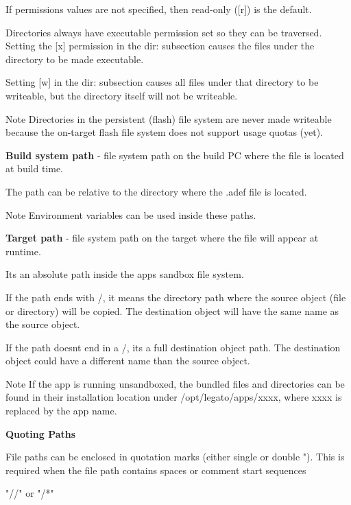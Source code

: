 If permissions values are not specified, then read-\/only (\mbox{[}r\mbox{]}) is the default.

Directories always have executable permission set so they can be traversed. Setting the {\ttfamily \mbox{[}x\mbox{]}} permission in the {\ttfamily dir\+:} subsection causes the files under the directory to be made executable.

Setting {\ttfamily \mbox{[}w\mbox{]}} in the {\ttfamily dir\+:} subsection causes all files under that directory to be writeable, but the directory itself will not be writeable.

\begin{DoxyNote}{Note}
Directories in the persistent (flash) file system are never made writeable because the on-\/target flash file system does not support usage quotas (yet).
\end{DoxyNote}
{\bfseries Build system path} -\/ file system path on the build P\+C where the file is located at build time.

The path can be relative to the directory where the {\ttfamily }.adef file is located.

\begin{DoxyNote}{Note}
Environment variables can be used inside these paths.
\end{DoxyNote}
{\bfseries Target path} -\/ file system path on the target where the file will appear at runtime.

It\textquotesingle{}s an absolute path inside the app\textquotesingle{}s sandbox file system.

If the path ends with \textquotesingle{}/\textquotesingle{}, it means the directory path where the source object (file or directory) will be copied. The destination object will have the same name as the source object.

If the path doesn\textquotesingle{}t end in a \textquotesingle{}/\textquotesingle{}, it\textquotesingle{}s a full destination object path. The destination object could have a different name than the source object.

\begin{DoxyNote}{Note}
If the app is running unsandboxed, the bundled files and directories can be found in their installation location under {\ttfamily /opt/legato/apps/xxxx}, where xxxx is replaced by the app name.
\end{DoxyNote}
{\bfseries Quoting Paths}

File paths can be enclosed in quotation marks (either single \textquotesingle{} or double "). This is required when the file path contains spaces or comment start sequences \begin{DoxyVerb}"//" or  "/*"
\end{DoxyVerb}


